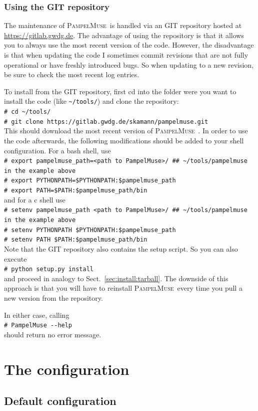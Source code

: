 \documentclass[a4paper,10pt]{article}
\newcommand{\shellcmd}[1]{\\\indent\indent\texttt{\footnotesize\# #1}}
\newcommand{\pampelmuse}{\textsc{PampelMuse}\ }
\begin{document}
\subsubsection{Using the GIT repository}
The maintenance of \pampelmuse is handled via an GIT repository hosted at \url{https://gitlab.gwdg.de}. The advantage of using the repository is that it allows you to always use the most recent version of the code. However, the disadvantage is that when updating the code I sometimes commit revisions that are not fully operational or have freshly introduced bugs. So when updating to a new revision, be sure to check the most recent log entries.

To install from the GIT repository, first cd into the folder were you want to install the code (like \texttt{\~{}/tools/}) and clone the repository:
\shellcmd{cd \~{}/tools/}
\shellcmd{git clone https://gitlab.gwdg.de/skamann/pampelmuse.git} \\
This should download the most recent version of \pampelmuse. In order to use the code afterwards, the following modifications should be added to your shell configuration. For a bash shell, use
\shellcmd{export pampelmuse\_path=<path to PampelMuse>/ \#\# \~{}/tools/pampelmuse in the example above}
\shellcmd{export PYTHONPATH=\$PYTHONPATH:\$pampelmuse\_path}
\shellcmd{export PATH=\$PATH:\$pampelmuse\_path/bin}\\
and for a c shell use
\shellcmd{setenv pampelmuse\_path <path to PampelMuse>/ \#\# \~{}/tools/pampelmuse in the example above}
\shellcmd{setenv PYTHONPATH \$PYTHONPATH:\$pampelmuse\_path}
\shellcmd{setenv PATH \$PATH:\$pampelmuse\_path/bin}\\
Note that the GIT repository also contains the setup script. So you can also execute
\shellcmd{python setup.py install} \\
and proceed in analogy to Sect.~\ref{sec:install:tarball}. The downside of this approach is that you will have to reinstall \pampelmuse every time you pull a new version from the repository.

In either case, calling
\shellcmd{PampelMuse -{}-help} \\
should return no error message.


\section{The configuration}
\label{sec:configuration}

\subsection{Default configuration}
\end{document}
